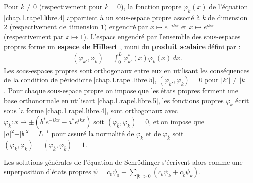 \medskip

Pour $k \neq 0 $ (respectivement pour $k = 0$), la fonction propre $\varphi_k(x)$ de l’équation \eqref{chap.1.rapel.libre.4} appartient à un sous-espace propre associé à $k$ de dimension 2 (respectivement de dimension 1) engendré par $x \mapsto e^{-ikx}$ et $x \mapsto e^{ikx}$ (respectivement par $x \mapsto 1$).
L’espace engendré par l’ensemble des sous-espaces propres forme un {\bf espace de Hilbert} , muni du {\bf produit scalaire} défini par :
\begin{eqnarray}
	( \varphi_{k'} , \varphi_{k} ) = \int_0^L \varphi_{k'}^\ast(x) \varphi_{k}(x) \, dx .\label{chap.1.rapel.libre.6}
\end{eqnarray}
Les sous-espaces propres sont orthogonaux entre eux \ie en utilisant les conséquences de la condition de périodicité \eqref{chap.1.rapel.libre.5}, $( \varphi_{k'} , \varphi_{k} ) = 0$ pour $\vert k' \vert \neq \vert k \vert  $ . 
Pour chaque sous-espace propre on impose que les états propres forment une base orthonormale \ie en utilisant \eqref{chap.1.rapel.libre.5}, les fonctions propres $\varphi_{k}$ écrit sous la forme \eqref{chap.1.rapel.libre.4}, sont orthogonaux avec $\varphi_{\overline{k}} \colon x \mapsto \pm ( b^\ast e^{-ikx} - a^\ast e^{ikx} )$  soit $(\varphi_{\overline{k}} , \varphi_{k} ) = 0$, et on impose que  $ \vert a \vert^2 + \vert b \vert^2 = L^{-1}$ pour assuré la normalité  de $\varphi_{k}$  et de $\varphi_{\overline{k}}$ soit  $( \varphi_{k} , \varphi_{k} ) = (\varphi_{\overline{k}} , \varphi_{\overline{k}})   = 1$. 

\medskip

Les solutions générales de l’équation de Schrödinger s’écrivent alors comme une superposition d’états propres  $\psi = c_0 \psi_0 +  \sum_{\vert k \vert > 0 } (c_k \psi_k  + c_{\overline{k}} \psi_{\overline{k}}) $. 

